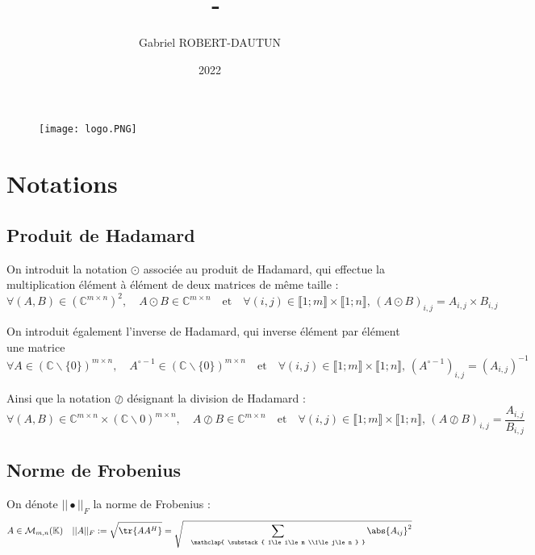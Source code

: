 \documentclass[titlepage]{article}
\author{Gabriel ROBERT-DAUTUN}
\date{2022}
\title{%
	\UE\, - \type\ifthenelse{\nb > 0}{\nb}{} \\
	\large \sbt}
\newcommand{\hinv}[1]{#1^{\circ-1}} %
\newcommand{\fnorm}[1]{|\vert#1|\vert_{F}} %
\begin{document}
	
	\begin{figure}
		\centering
		\texttt{[image: logo.PNG]}
		\label{fig:logo}
	\end{figure}
	\maketitle
	
	\newpage
	\tableofcontents
	
	\newpage
	\section{Notations}
	\subsection{Produit de Hadamard}
	
	On introduit la notation $\odot$ associée au produit de Hadamard, qui effectue la multiplication élément à élément de deux matrices de même taille :
	$$
	\forall (A,B)\in\left(\mathbb{C}^{m\times n}\right)^2, \quad A\odot B\in\mathbb{C}^{m\times n} \quad\text{et}\quad \forall (i,j)\in\llbracket1;m\rrbracket\times\llbracket1;n\rrbracket,\, (A\odot B)_{i,j} = A_{i,j}\times B_{i,j}
	$$
	
	On introduit également l'inverse de Hadamard, qui inverse élément par élément une matrice
	$$
		\forall A \in \left(\mathbb{C}\backslash\{0\}\right)^{m\times n},\quad \hinv{A}\in\left(\mathbb{C}\backslash\{0\}\right)^{m\times n} \quad\text{et}\quad \forall (i,j)\in\llbracket1;m\rrbracket\times\llbracket1;n\rrbracket,\, \left(\hinv{A}\right)_{i,j} = \left(A_{i,j}\right)^{-1}
	$$ 
	
	Ainsi que la notation $\oslash$ désignant la division de Hadamard :
		$$
	\forall (A,B)\in\mathbb{C}^{m\times n}\times\left(\mathbb{C}\backslash0\right)^{m\times n}, \quad A\oslash B\in\mathbb{C}^{m\times n} \quad\text{et}\quad \forall (i,j)\in\llbracket1;m\rrbracket\times\llbracket1;n\rrbracket,\, (A\oslash B)_{i,j} = \frac{A_{i,j}}{B_{i,j}}
	$$
	
	\subsection{Norme de Frobenius}
	
	On dénote $\fnorm{\bullet}$ la norme de Frobenius :
	$$
		A\in\mathcal{M}_{m,n}(\mathbb{K}) \quad \fnorm{A} := \sqrt{\tr{AA^H}} = \sqrt{
				\;\;\;\sum_{
					\mathclap{
						\substack{
							1\le i\le m \\1\le j\le n
						}
					}
				}\abs{A_{ij}}^2}
	$$
	
\end{document}
